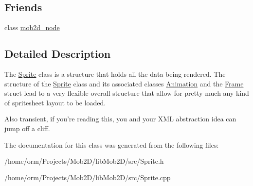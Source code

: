 \subsection*{Friends}
\begin{DoxyCompactItemize}
\item 
\hypertarget{classSprite_a8062666e3cdb41d93575a5739308bb29}{
class \hyperlink{classSprite_a8062666e3cdb41d93575a5739308bb29}{mob2d\_\-node}}
\label{classSprite_a8062666e3cdb41d93575a5739308bb29}

\end{DoxyCompactItemize}


\subsection{Detailed Description}
The \hyperlink{classSprite}{Sprite} class is a structure that holds all the data being rendered. The structure of the \hyperlink{classSprite}{Sprite} class and its associated classes \hyperlink{classAnimation}{Animation} and the \hyperlink{structFrame}{Frame} struct lead to a very flexible overall structure that allow for pretty much any kind of spritesheet layout to be loaded.

Also transient, if you're reading this, you and your XML abstraction idea can jump off a cliff. 

The documentation for this class was generated from the following files:\begin{DoxyCompactItemize}
\item 
/home/orm/Projects/Mob2D/libMob2D/src/Sprite.h\item 
/home/orm/Projects/Mob2D/libMob2D/src/Sprite.cpp\end{DoxyCompactItemize}
